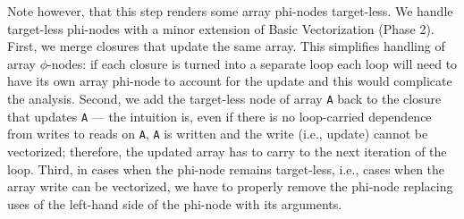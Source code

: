 \documentclass[sigconf, screen, natbib=false, dvipsnames, table]{acmart}
\theoremstyle{definition}
\begin{document}
Note however, that this step renders some array phi-nodes target-less. We handle target-less phi-nodes with a minor extension of Basic Vectorization (Phase 2). 
First, we merge closures that update the same array. This simplifies handling of array $\phi$-nodes: if each closure is turned into a separate loop
each loop will need to have its own array phi-node to account for the update and this would complicate the analysis.
Second, we add the target-less node of array \texttt{A} back to the closure that updates \texttt{A} ---
the intuition is, even if there is no loop-carried dependence from writes to reads on \texttt{A}, \texttt{A} is written and the write (i.e., update) cannot be vectorized; 
therefore, the updated array has to carry to the next iteration of the loop. Third, in cases when the phi-node remains target-less, i.e., cases when the
array write can be vectorized, we have to properly remove the phi-node replacing uses of the left-hand side of the phi-node with its arguments.

\end{document}
